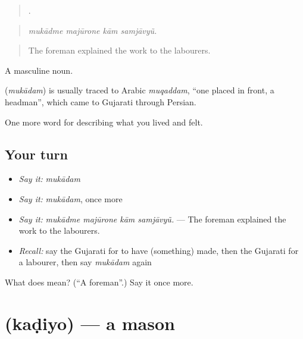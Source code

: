 \begin{quote}
   .
\end{quote}

\begin{quote}
\emph{mukādme majūrone kām samjāvyũ.}
\end{quote}

\begin{quote}
The foreman explained the work to the labourers.
\end{quote}

A masculine noun.

\begin{cousinweb}
\textbf{} (\emph{mukādam}) is usually traced to Arabic \emph{muqaddam}, \textquotedblleft{}one placed in front, a headman\textquotedblright{}, which came to Gujarati through Persian.
\end{cousinweb}

\begin{grammarlens}[title={What you've built}]
One more word for describing what you lived and felt.
\end{grammarlens}

\subsection*{Your turn}
\begin{itemize}
\raggedright
  \item \emph{Say it:} \emph{mukādam}
  \item \emph{Say it:} \emph{mukādam}, once more
  \item \emph{Say it:} \emph{mukādme majūrone kām samjāvyũ.} — The foreman explained the work to the labourers.
  \item \emph{Recall:} say the Gujarati for to have (something) made, then the Gujarati for a labourer, then say \emph{mukādam} again
\end{itemize}

\begin{tcolorbox}[breakable,colback=teal!4,colframe=teal!35!black,title={Before you move on}]
What does  mean? (\textquotedblleft{}A foreman\textquotedblright{}.) Say it once more.
\end{tcolorbox}
\section[\texorpdfstring{\gu{કડિયો} (kaḍiyo)}{કડિયો (kaḍiyo)}]{ (kaḍiyo) — a mason}

